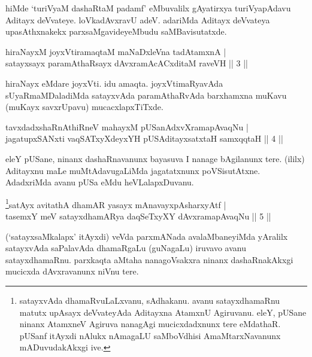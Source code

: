 \begin{artha} 
hiMde `turiVyaM dashaRtaM padamf' eMbuvalilx gAyatirxya turiVyapAdavu 
Aditayx deVvateye. loVkadAvxravU adeV. adariMda Aditayx deVvateya 
upasAthxnakekx parxsaMgavideyeMbudu saMBavisutatxde.
\end{artha}


\begin{shl}
hiraNayxM joyxVtiramaqtaM maNaDxleVna tadAtamxnA | \\
satayxsayx paramAthaRsayx dAvxramAcACxditaM raveVH \hfill||  3 || 
\end{shl}

\begin{artha} 
hiraNayx eMdare joyxVti. idu amaqta. joyxVtimaRyavAda 
sUyaRmaMDaladiMda satayxvAda paramAthaRvAda barxhamxna muKavu (muKayx 
savxrUpavu) mucacxlapxTiTxde.
\end{artha}


\begin{shl}
tavxdadxshaRnAthiRneV mahayxM pUSanAdxvXramapAvaqNu | \\
jagatupxSANxti vaqSATxyXdeyxYH pUSA\s \s ditayxsatxtaH samxqqtaH \hfill||  4 || 
\end{shl}

\begin{artha} 
eleY pUSane, ninanx dashaRnavanunx bayasuva I nanage bAgilanunx tere. 
(ililx) Aditayxnu maLe muMtAdavugaLiMda jagatatxnunx poVSisutAtxne. 
AdadxriMda avanu pUSa eMdu heVLalapxDuvanu.
\end{artha}


\begin{shl}
\footnote{satayxvAda dhamaRvuLaLxvanu, sAdhakanu. avanu 
satayxdhamaRnu matutx upAsayx deVvateyAda Aditayxna AtamxnU Agiruvanu. 
eleY, pUSane ninanx AtamxneV Agiruva nanagAgi mucicxdadxnunx tere 
eMdathaR. pUSanf itAyxdi nAlukx nAmagaLU saMboVdhisi AmaMtarxNavanunx 
mADuvudakAkxgi ive.}satAyx avitathA dhamAR yasayx mAnavayxpAsharxyAtf | \\
tasemxY meV satayxdhamARya daqSeTxyXY dAvxramapAvaqNu \hfill||  5 || 
\end{shl}

\begin{artha} 
(`satayxsaMkalapx' itAyxdi) veVda parxmANada avalaMbaneyiMda yAralilx 
satayxvAda saPalavAda dhamaRgaLu (guNagaLu) iruvavo avanu 
satayxdhamaRnu. parxkaqta aMtaha nanagoVsakxra ninanx dashaRnakAkxgi 
mucicxda dAvxravanunx niVnu tere.
\end{artha}

